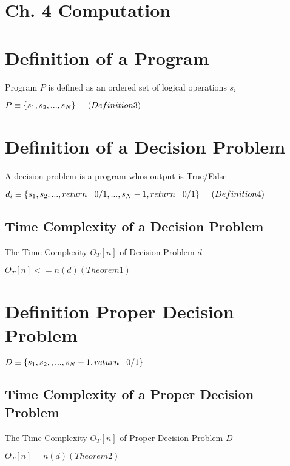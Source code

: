 \documentclass[11pt]{article}
\begin{document}
\section*{Ch. 4 Computation}

\section{Definition of a Program}
Program $P$ is defined as an ordered set of logical operations $s_i$
\begin{center}
$
P \equiv \{ s_1,s_2,...,s_N \} \hspace{5mm} (Definition 3)
$
\end{center}

\section{Definition of a Decision Problem}
A decision problem is a program whos output is True/False
\begin{center}
$
d_i \equiv \{s_1,s_2,..., return \hspace{3mm} 0/1,...,s_N-1,return \hspace{3mm} 0/1\} \hspace{5mm} (Definition 4)
$
\end{center}
\subsection{Time Complexity of a Decision Problem}
The Time Complexity $O_T [n]$ of Decision Problem $d$
\begin{center}
$
O_T[n] <= n(d) (Theorem 1)
$
\end{center}
\section{Definition Proper Decision Problem}
\begin{center}
$
D \equiv \{s_1,s_2,,...,s_N-1,return \hspace{3mm} 0/1\}
$
\end{center}
\subsection{Time Complexity of a Proper Decision Problem}
The Time Complexity $O_T [n]$ of Proper Decision Problem $D$
\begin{center}
$
O_T[n] = n(d) (Theorem 2)
$
\end{center}
\end{document}

